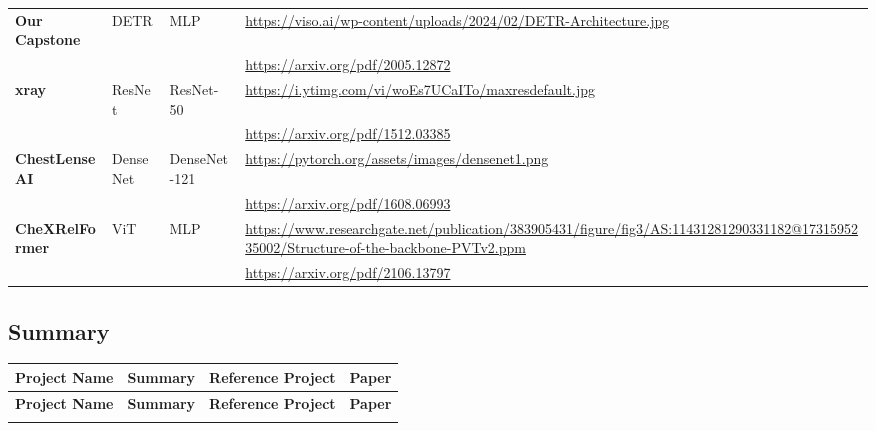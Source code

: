 \documentclass[12pt, titlepage]{article}
\begin{document}
\begin{landscape}
\begin{longtable}{|l|l|l|p{10cm}|}
\textbf{Our Capstone}    & DETR                    & MLP                     & \url{https://viso.ai/wp-content/uploads/2024/02/DETR-Architecture.jpg} \\ 
                         &                         &                         & \url{https://arxiv.org/pdf/2005.12872} \\ \hline
\textbf{xray}           & ResNet                  & ResNet-50               & \url{https://i.ytimg.com/vi/woEs7UCaITo/maxresdefault.jpg} \\ 
                         &                         &                         & \url{https://arxiv.org/pdf/1512.03385} \\ \hline
\textbf{ChestLenseAI}   & DenseNet                & DenseNet-121            & \url{https://pytorch.org/assets/images/densenet1.png} \\ 
                         &                         &                         & \url{https://arxiv.org/pdf/1608.06993} \\ \hline
\textbf{CheXRelFormer}  & ViT                     & MLP                     & \url{https://www.researchgate.net/publication/383905431/figure/fig3/AS:11431281290331182@1731595235002/Structure-of-the-backbone-PVTv2.ppm} \\ 
                         &                         &                         & \url{https://arxiv.org/pdf/2106.13797} \\ \hline

\end{longtable}

\newpage

\subsection{Summary}
\begin{longtable}{|l|p{10cm}|p{4cm}|p{4cm}|}
\hline
\textbf{Project Name}   & \textbf{Summary}                                                                 & \textbf{Reference Project}                              & \textbf{Paper}                                                \\ \hline
\endfirsthead
\hline
\textbf{Project Name}   & \textbf{Summary}                                                                 & \textbf{Reference Project}                              & \textbf{Paper}                                                \\ \hline
\endhead
\hline
\endfoot


\end{longtable}
\end{landscape}
\end{document}
